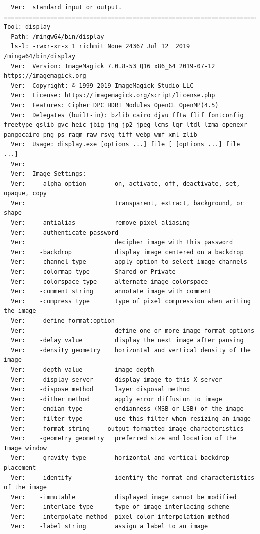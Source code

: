 \documentclass[11pt]{article}
\begin{document}
\begin{verbatim}
  Ver:  standard input or output.
==========================================================================================
Tool: display
  Path: /mingw64/bin/display
  ls-l: -rwxr-xr-x 1 richmit None 24367 Jul 12  2019 /mingw64/bin/display
  Ver:  Version: ImageMagick 7.0.8-53 Q16 x86_64 2019-07-12 https://imagemagick.org
  Ver:  Copyright: © 1999-2019 ImageMagick Studio LLC
  Ver:  License: https://imagemagick.org/script/license.php
  Ver:  Features: Cipher DPC HDRI Modules OpenCL OpenMP(4.5) 
  Ver:  Delegates (built-in): bzlib cairo djvu fftw flif fontconfig freetype gslib gvc heic jbig jng jp2 jpeg lcms lqr ltdl lzma openexr pangocairo png ps raqm raw rsvg tiff webp wmf xml zlib
  Ver:  Usage: display.exe [options ...] file [ [options ...] file ...]
  Ver:  
  Ver:  Image Settings:
  Ver:    -alpha option        on, activate, off, deactivate, set, opaque, copy
  Ver:                         transparent, extract, background, or shape
  Ver:    -antialias           remove pixel-aliasing
  Ver:    -authenticate password
  Ver:                         decipher image with this password
  Ver:    -backdrop            display image centered on a backdrop
  Ver:    -channel type        apply option to select image channels
  Ver:    -colormap type       Shared or Private
  Ver:    -colorspace type     alternate image colorspace
  Ver:    -comment string      annotate image with comment
  Ver:    -compress type       type of pixel compression when writing the image
  Ver:    -define format:option
  Ver:                         define one or more image format options
  Ver:    -delay value         display the next image after pausing
  Ver:    -density geometry    horizontal and vertical density of the image
  Ver:    -depth value         image depth
  Ver:    -display server      display image to this X server
  Ver:    -dispose method      layer disposal method
  Ver:    -dither method       apply error diffusion to image
  Ver:    -endian type         endianness (MSB or LSB) of the image
  Ver:    -filter type         use this filter when resizing an image
  Ver:    -format string     output formatted image characteristics
  Ver:    -geometry geometry   preferred size and location of the Image window
  Ver:    -gravity type        horizontal and vertical backdrop placement
  Ver:    -identify            identify the format and characteristics of the image
  Ver:    -immutable           displayed image cannot be modified
  Ver:    -interlace type      type of image interlacing scheme
  Ver:    -interpolate method  pixel color interpolation method
  Ver:    -label string        assign a label to an image

\end{verbatim}
\end{document}

